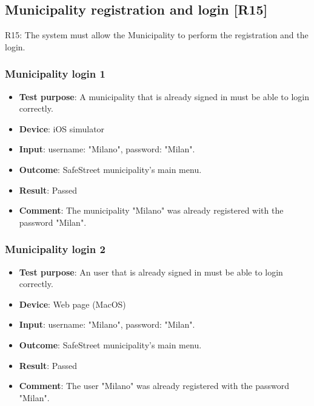\documentclass[../ATD.tex]{subfiles}
\begin{document}
    \subsection{Municipality registration and login [R15]}\label{subsec:municipality-registration-and-login}
    R15: The system must allow the Municipality to perform the registration and the login.

    \subsubsection{Municipality login 1}\label{subsubsec:municipality-login-1}
    \begin{itemize}
        \item \textbf{Test purpose}: A municipality that is already signed in must be able to login correctly.
        \item \textbf{Device}: iOS simulator
        \item \textbf{Input}: username: "Milano", password: "Milan".
        \item \textbf{Outcome}: SafeStreet municipality's main menu.
        \item \textbf{Result}: Passed
        \item \textbf{Comment}: The municipality "Milano" was already registered with the password "Milan".
    \end{itemize}

    \subsubsection{Municipality login 2}\label{subsubsec:municipality-login-2}
    \begin{itemize}
        \item \textbf{Test purpose}: An user that is already signed in must be able to login correctly.
        \item \textbf{Device}: Web page (MacOS)
        \item \textbf{Input}: username: "Milano", password: "Milan".
        \item \textbf{Outcome}: SafeStreet municipality's main menu.
        \item \textbf{Result}: Passed
        \item \textbf{Comment}: The user "Milano" was already registered with the password "Milan".
    \end{itemize}
\end{document}
